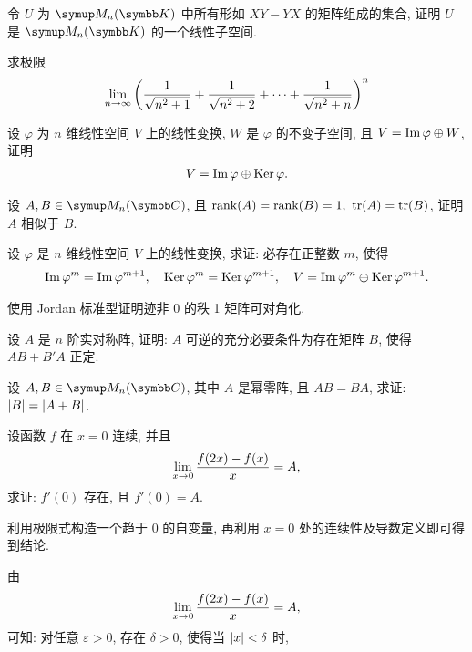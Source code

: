 \begin{exercise}[series=exer]
\begin{exercise}
        \item 令 $ U $ 为 $ \MM[\K] $ 中所有形如 $ XY - YX $ 的矩阵组成的集合, 证明 $ U $ 是 $ \MM[\K] $ 的一个线性子空间. 
    \end{exercise}
    \item 求极限
    \begin{align*}
        \lim_{n \to \infty} \qty(\frac{1}{\sqrt{n^{2} + 1}} + \frac{1}{\sqrt{n^{2} + 2}} + \dots + \frac{1}{\sqrt{n^{2} + n}})^{n}
    \end{align*}
    \item 设 $ \varphi $ 为 $ n $ 维线性空间 $ V $ 上的线性变换, $ W $ 是 $ \varphi $ 的不变子空间, 且 $ V = \operatorname{Im} \varphi \oplus W $, 证明
    \begin{align*}
        V = \operatorname{Im} \varphi \oplus \operatorname{Ker} \varphi.
    \end{align*}
    \item 设 $ A, B \in \MM[\C] $, 且 $ \rank(A) = \rank(B)  = 1,\ \tr(A) = \tr(B) $, 证明 $ A $ 相似于 $ B $.
    \item 设 $ \varphi $ 是 $ n $ 维线性空间 $ V $ 上的线性变换, 求证: 必存在正整数 $ m $, 使得
    \begin{align*}
        \operatorname{Im} \varphi^{m} = \operatorname{Im} \varphi^{m+1},\quad \operatorname{Ker} \varphi^{m} = \operatorname{Ker} \varphi^{m+1}, \quad V = \operatorname{Im} \varphi^{m} \oplus \operatorname{Ker} \varphi^{m+1}.
    \end{align*}
    \item 使用 Jordan 标准型证明迹非 $ 0 $ 的秩 1 矩阵可对角化.
    \item 设 $ A $ 是 $ n $ 阶实对称阵, 证明: $ A $ 可逆的充分必要条件为存在矩阵 $ B $, 使得 $ AB + B'A $ 正定.
    \item 设 $ A, B \in \MM[\C] $, 其中 $ A $ 是幂零阵, 且 $ AB = BA $, 求证: $ \abs{B} = \abs{A + B} $. 
    \item 设函数 $ f $ 在 $ x = 0 $ 连续, 并且
    \begin{align*}
        \lim_{x \to 0}\frac{f(2x) - f(x)}{x} = A,
    \end{align*}
    求证: $ f'(0) $ 存在, 且 $ f'(0) = A $. 
    \begin{hint}
        利用极限式构造一个趋于 $ 0 $ 的自变量, 再利用 $ x = 0 $ 处的连续性及导数定义即可得到结论.
    \end{hint}
    \begin{answer}
        由
        \begin{align*}
            \lim_{x \to 0}\frac{f(2x) - f(x)}{x} = A,
        \end{align*}
        可知: 对任意 $ \varepsilon > 0 $, 存在 $ \delta > 0 $, 使得当 $ \abs{x} < \delta $ 时, 

\end{answer}
\end{exercise}

